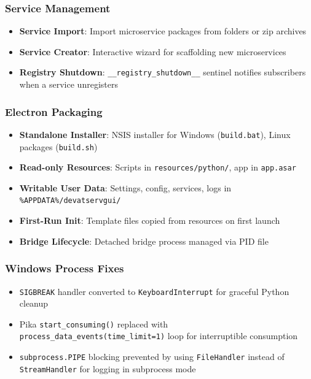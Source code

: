 \subsubsection{Service Management}

\begin{itemize}
   \item \textbf{Service Import}: Import microservice packages from folders or zip archives
   \item \textbf{Service Creator}: Interactive wizard for scaffolding new microservices
   \item \textbf{Registry Shutdown}: \texttt{\_\_registry\_shutdown\_\_} sentinel notifies subscribers
         when a service unregisters
\end{itemize}

\subsubsection{Electron Packaging}

\begin{itemize}
   \item \textbf{Standalone Installer}: NSIS installer for Windows (\texttt{build.bat}),
         Linux packages (\texttt{build.sh})
   \item \textbf{Read-only Resources}: Scripts in \texttt{resources/python/}, app in \texttt{app.asar}
   \item \textbf{Writable User Data}: Settings, config, services, logs in
         \texttt{\%APPDATA\%/devatservgui/}
   \item \textbf{First-Run Init}: Template files copied from resources on first launch
   \item \textbf{Bridge Lifecycle}: Detached bridge process managed via PID file
\end{itemize}

\subsubsection{Windows Process Fixes}

\begin{itemize}
   \item \texttt{SIGBREAK} handler converted to \texttt{KeyboardInterrupt} for graceful Python cleanup
   \item Pika \texttt{start\_consuming()} replaced with \texttt{process\_data\_events(time\_limit=1)}
         loop for interruptible consumption
   \item \texttt{subprocess.PIPE} blocking prevented by using \texttt{FileHandler} instead of
         \texttt{StreamHandler} for logging in subprocess mode
\end{itemize}


